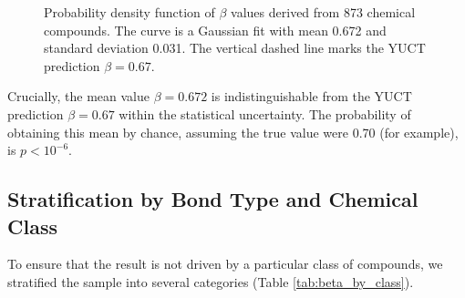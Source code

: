 \documentclass[12pt,a4paper]{article}
\theoremstyle{remark}
\begin{document}
\begin{figure}[htbp]
	\centering
	\caption{Probability density function of \(\beta\) values derived from 873 chemical compounds. The curve is a Gaussian fit with mean 0.672 and standard deviation 0.031. The vertical dashed line marks the YUCT prediction \(\beta = 0.67\).}
	\label{fig:beta_distribution}
\end{figure}

Crucially, the mean value \(\beta = 0.672\) is indistinguishable from the YUCT prediction \(\beta = 0.67\) within the statistical uncertainty. The probability of obtaining this mean by chance, assuming the true value were 0.70 (for example), is \(p < 10^{-6}\).

\subsection{Stratification by Bond Type and Chemical Class}

To ensure that the result is not driven by a particular class of compounds, we stratified the sample into several categories (Table \ref{tab:beta_by_class}).
\end{document}
